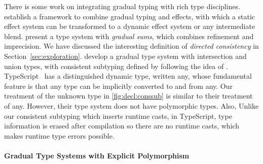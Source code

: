 There is some work on integrating gradual typing with rich type disciplines.
\citet{Ba_ados_Schwerter_2014} establish a framework to combine gradual typing and
effects, with which a static effect system can be transformed to a dynamic
effect system or any intermediate blend. \citet{Jafery:2017:SUR:3093333.3009865}
present a type system with \emph{gradual sums}, which combines refinement and
imprecision. We have discussed the interesting definition of \emph{directed
  consistency} in Section~\ref{sec:exploration}. \citet{castagna2017gradual} develop a gradual type system with
intersection and union types, with consistent subtyping defined by following
the idea of \citet{garcia2016abstracting}.
TypeScript~\citep{typescript} has a distinguished dynamic type, written {\color{blue} any}, whose fundamental feature is that any type can be
implicitly converted to and from {\color{blue} any}.
Our treatment of the unknown type in \cref{fig:decl:conssub} is similar to their
treatment of {\color{blue} any}. However, their type system does not have
polymorphic types. Also, Unlike our consistent subtyping which inserts runtime
casts, in TypeScript, type information is erased after compilation so there are
no runtime casts, which makes runtime type errors possible.


\paragraph{Gradual Type Systems with Explicit Polymorphism}


